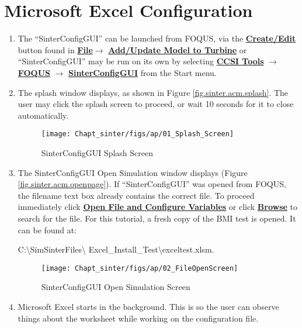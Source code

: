\section{Microsoft Excel Configuration}
\label{sec.tut.simsinter.excel}

\begin{enumerate}

\item The ``SinterConfigGUI'' can be launched from FOQUS, via the
  \textbf{\underline{Create/Edit}} button found in
  \textbf{\underline{File}}$\rightarrow$ \textbf{\underline{Add/Update Model to
      Turbine}}    or ``SinterConfigGUI'' may be  run on its
  own by selecting \textbf{\underline{CCSI Tools}} $\rightarrow$
  \textbf{\underline{FOQUS}} $\rightarrow$
  \textbf{\underline{SinterConfigGUI}} from the Start menu.

\item	The splash window displays, as shown in Figure \ref{fig.sinter.acm.splash}.  The user may click the splash screen to proceed, or wait 10 seconds for it to close automatically.
\begin{figure}[H]
	\begin{center}
		\texttt{[image: Chapt\_sinter/figs/ap/01\_Splash\_Screen]}
		\caption{SinterConfigGUI Splash Screen}
		\label{fig.sinter.excel.splash}
	\end{center}
\end{figure}

\item	The SinterConfigGUI Open Simulation window displays (Figure \ref{fig.sinter.acm.openpage}). If ``SinterConfigGUI'' was
  opened from FOQUS, the filename text box already contains the
  correct file.  To proceed immediately click \textbf{\underline{Open File and
  Configure Variables}} or click \textbf{\underline{Browse}} to search for the
  file. For this tutorial, a fresh copy of the BMI test is opened.  It
  can be found at: 

C:\textbackslash SimSinterFiles\textbackslash
  Excel\_Install\_Test\textbackslash exceltest.xlsm.
  
	\begin{figure}[H]
		\begin{center}
			\texttt{[image: Chapt\_sinter/figs/ap/02\_FileOpenScreen]}
			\caption{SinterConfigGUI Open Simulation Screen}
			\label{fig.sinter.excel.openpage}
		\end{center}
	\end{figure}


\item Microsoft Excel starts in the background.  This is so the user can observe things about the worksheet while working on the configuration file.


\end{enumerate}

